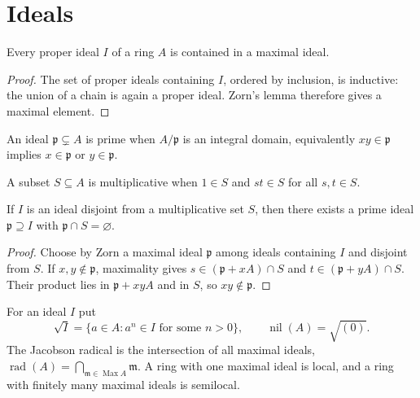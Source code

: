 \section{Ideals}

\begin{theorem}
\label{mcrt-auto-theorem-1-1}
\uses{}
Every proper ideal $I$ of a ring $A$ is contained in a maximal ideal.
\end{theorem}
\begin{proof}
The set of proper ideals containing $I$, ordered by inclusion, is inductive:
the union of a chain is again a proper ideal.  Zorn's lemma therefore gives a
maximal element.
\end{proof}

\begin{definition}
An ideal $\mathfrak p\subsetneq A$ is prime when $A/\mathfrak p$ is an integral
domain, equivalently $xy\in\mathfrak p$ implies $x\in\mathfrak p$ or
$y\in\mathfrak p$.
\uses{}
\end{definition}

\begin{definition}
A subset $S\subseteq A$ is multiplicative when $1\in S$ and $st\in S$ for all
$s,t\in S$.
\uses{}
\end{definition}

\begin{theorem}
\label{mcrt-auto-theorem-1-2}
\uses{}
If $I$ is an ideal disjoint from a multiplicative set $S$, then there exists a
prime ideal $\mathfrak p\supseteq I$ with $\mathfrak p\cap S=\varnothing$.
\end{theorem}
\begin{proof}
Choose by Zorn a maximal ideal $\mathfrak p$ among ideals containing $I$ and
disjoint from $S$.  If $x,y\notin\mathfrak p$, maximality gives
$s\in(\mathfrak p+xA)\cap S$ and $t\in(\mathfrak p+yA)\cap S$.  Their product
lies in $\mathfrak p+xyA$ and in $S$, so $xy\notin\mathfrak p$.
\end{proof}

\begin{definition}
For an ideal $I$ put
\[
\sqrt I=\{a\in A:a^n\in I\text{ for some }n>0\},\qquad
\operatorname{nil}(A)=\sqrt{(0)}.
\]
The Jacobson radical is the intersection of all maximal ideals,
$\operatorname{rad}(A)=\bigcap_{\mathfrak m\in\operatorname{Max}A}\mathfrak m$.
A ring with one maximal ideal is local, and a ring with finitely many maximal
ideals is semilocal.
\uses{}
\end{definition}

